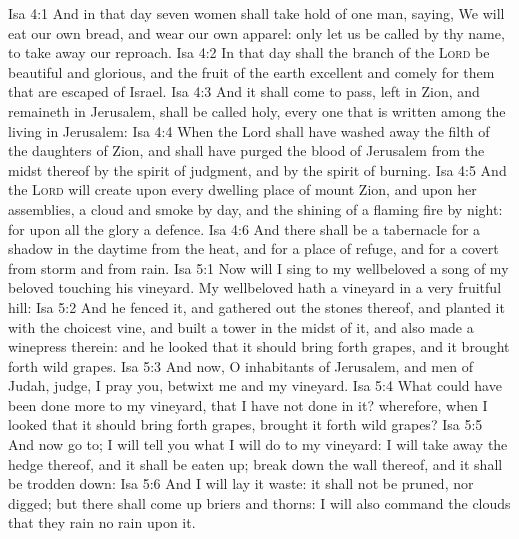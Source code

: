 \vs Isa 4:1 And in that day seven women shall take hold of one man, saying, We will eat our own bread, and wear our own apparel: only let us be called by thy name, to take away our reproach.
\vs Isa 4:2 In that day shall the branch of the \textsc{Lord} be beautiful and glorious, and the fruit of the earth  excellent and comely for them that are escaped of Israel.
\vs Isa 4:3 And it shall come to pass,  left in Zion, and  remaineth in Jerusalem, shall be called holy,  every one that is written among the living in Jerusalem:
\vs Isa 4:4 When the Lord shall have washed away the filth of the daughters of Zion, and shall have purged the blood of Jerusalem from the midst thereof by the spirit of judgment, and by the spirit of burning.
\vs Isa 4:5 And the \textsc{Lord} will create upon every dwelling place of mount Zion, and upon her assemblies, a cloud and smoke by day, and the shining of a flaming fire by night: for upon all the glory  a defence.
\vs Isa 4:6 And there shall be a tabernacle for a shadow in the daytime from the heat, and for a place of refuge, and for a covert from storm and from rain.
\vs Isa 5:1 Now will I sing to my wellbeloved a song of my beloved touching his vineyard. My wellbeloved hath a vineyard in a very fruitful hill:
\vs Isa 5:2 And he fenced it, and gathered out the stones thereof, and planted it with the choicest vine, and built a tower in the midst of it, and also made a winepress therein: and he looked that it should bring forth grapes, and it brought forth wild grapes.
\vs Isa 5:3 And now, O inhabitants of Jerusalem, and men of Judah, judge, I pray you, betwixt me and my vineyard.
\vs Isa 5:4 What could have been done more to my vineyard, that I have not done in it? wherefore, when I looked that it should bring forth grapes, brought it forth wild grapes?
\vs Isa 5:5 And now go to; I will tell you what I will do to my vineyard: I will take away the hedge thereof, and it shall be eaten up;  break down the wall thereof, and it shall be trodden down:
\vs Isa 5:6 And I will lay it waste: it shall not be pruned, nor digged; but there shall come up briers and thorns: I will also command the clouds that they rain no rain upon it.
